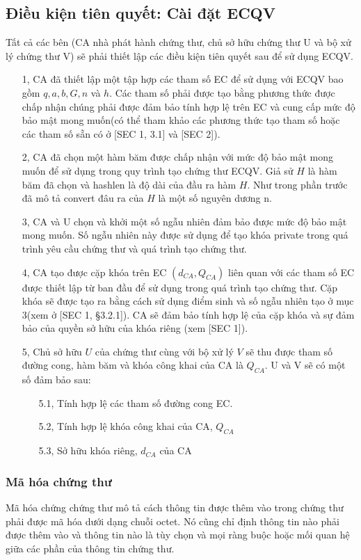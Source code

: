 \documentclass[a4paper,12pt]{report}
\begin{document}
\subsection{Điều kiện tiên quyết: Cài đặt ECQV}
Tất cả các bên (CA nhà phát hành chứng thư, chủ sở hữu chứng thư U và bộ xử lý chứng thư V) sẽ phải thiết lập các điều kiện tiên quyết sau để sử dụng ECQV.
\begin{itemize}
\item[1, ] CA đã thiết lập một tập hợp các tham số EC để sử dụng với ECQV bao gồm $q, a, b, G, n$ và $h$. Các tham số phải được tạo bằng phương thức được chấp nhận chúng phải được đảm bảo tính hợp lệ trên EC và cung cấp mức độ bảo mật mong muốn(có thể tham khảo các phương thức tạo tham số hoặc các tham số sẵn có ở [SEC 1, 3.1] và [SEC 2]).
\item[2, ] CA đã chọn một hàm băm được chấp nhận với mức độ bảo mật mong muốn để sử dụng trong quy trình tạo chứng thư ECQV. Giả sử $H$ là hàm băm đã chọn và hashlen là độ dài của đầu ra hàm $H$. Như trong phần trước đã mô tả convert đâu ra của $H$ là một số nguyên dương n.
\item[3, ] CA và U chọn và khởi một số ngẫu nhiên đảm bảo được mức độ bảo mật mong muốn. Số ngẫu nhiên này được sử dụng để tạo khóa private trong quá trình yêu cầu chứng thư và quá trình tạo chứng thư.
\item[4, ] CA tạo được cặp khóa trên EC $(d_{CA}, Q_{CA})$ liên quan với các tham số EC được thiết lập từ ban đầu để sử dụng trong quá trình tạo chứng thư. Cặp khóa sẽ được tạo ra bằng cách sử dụng điểm  sinh và số ngẫu nhiên tạo ở mục 3(xem ở [SEC 1, §3.2.1]). CA sẽ đảm bảo tính hợp lệ của cặp khóa và sự đảm bảo của quyền sở hữu của khóa riêng (xem [SEC 1]).
\item[5, ] Chủ sở hữu $U$ của chứng thư cùng với bộ xử lý $V$ sẽ thu được tham số đường cong, hàm băm và khóa công khai của CA là $Q_{CA}$. U và V sẽ có một số đảm bảo sau:
\begin{itemize}
\item[5.1, ] Tính hợp lệ các tham số đường cong EC.
\item[5.2, ] Tính hợp lệ khóa công khai của CA, $Q_{CA}$
\item[5.3, ] Sở hữu khóa riêng, $d_{CA}$ của CA
\end{itemize}
\end{itemize}
\subsubsection{Mã hóa chứng thư} \label{subsec:3.5.2.1}
Mã hóa chứng chứng thư mô tả cách thông tin được thêm vào trong chứng thư phải được mã hóa dưới dạng chuỗi octet. Nó cũng chỉ định thông tin nào phải được thêm vào và thông tin nào là tùy chọn và mọi ràng buộc hoặc mối quan hệ giữa các phần của thông tin chứng thư.
\end{document}
